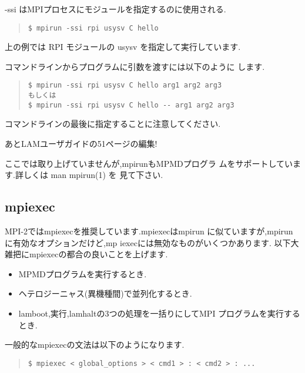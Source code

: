 \documentclass[a4paper,titlepage]{jreport}
\begin{document}
-ssi はMPIプロセスにモジュールを指定するのに使用される.

\begin{quote}
\begin{screen}
\begin{verbatim}
$ mpirun -ssi rpi usysv C hello
\end{verbatim}
\end{screen}
\end{quote}

上の例では RPI モジュールの usysv を指定して実行しています.

コマンドラインからプログラムに引数を渡すには以下のように
します.

\begin{quote}
\begin{screen}
\begin{verbatim}
$ mpirun -ssi rpi usysv C hello arg1 arg2 arg3
もしくは
$ mpirun -ssi rpi usysv C hello -- arg1 arg2 arg3
\end{verbatim}
\end{screen}
\end{quote}

コマンドラインの最後に指定することに注意してください.

あとLAMユーザガイドの51ページの編集!

ここでは取り上げていませんが,mpirunもMPMDプログラ
ムをサポートしています.詳しくは man mpirun(1) を
見て下さい.

\subsection{mpiexec}
MPI-2ではmpiexecを推奨しています.mpiexecはmpirun
に似ていますが,mpirunに有効なオプションだけど,mp
iexecには無効なものがいくつかあります.
以下大雑把にmpiexecの都合の良いことを上げます.

\begin{itemize}
\item MPMDプログラムを実行するとき.
\item ヘテロジーニャス(異機種間)で並列化するとき.
\item lamboot,実行,lamhaltの3つの処理を一括りにしてMPI
      プログラムを実行するとき.
\end{itemize}

一般的なmpiexecの文法は以下のようになります.

\begin{quote}
\begin{screen}
\begin{verbatim}
$ mpiexec < global_options > < cmd1 > : < cmd2 > : ...
\end{verbatim}
\end{screen}
\end{quote}
\end{document}
